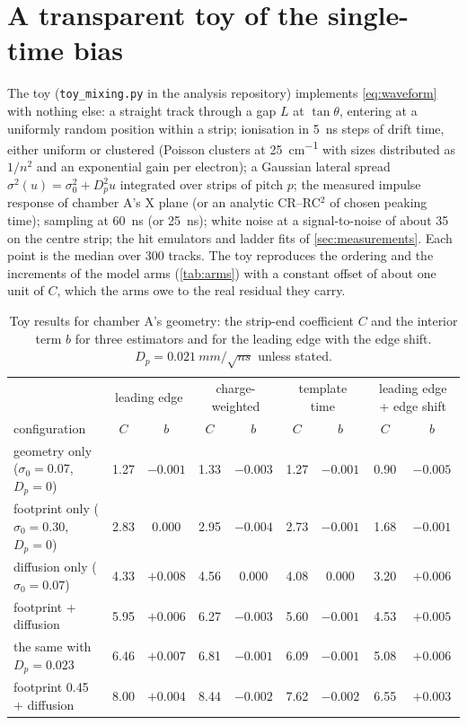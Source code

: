 \section{A transparent toy of the single-time bias}\label{app:toy}
\label{sec:toy}

The toy (\texttt{toy\_mixing.py} in the analysis repository) implements \cref{eq:waveform} with nothing else: a straight track
through a gap $L$ at $\tan\theta$, entering at a uniformly random position within a strip; ionisation in \SI{5}{ns} steps of
drift time, either uniform or clustered (Poisson clusters at \SI{25}{cm^{-1}} with sizes distributed as $1/n^2$ and an
exponential gain per electron); a Gaussian lateral spread $\sigma^2(u) = \sigma_0^2 + D_p^2 u$ integrated over strips of pitch $p$;
the measured impulse response of chamber A's X plane (or an analytic CR--RC$^2$ of chosen peaking time); sampling at
\SI{60}{ns} (or \SI{25}{ns}); white noise at a signal-to-noise of about 35 on the centre strip; the hit emulators and ladder
fits of \cref{sec:measurements}. Each point is the median over 300 tracks. The toy reproduces the ordering and the
increments of the model arms (\cref{tab:arms}) with a constant offset of about one unit of $C$, which the arms owe to the real
residual they carry.

\begin{table}[h]
  \centering\small
  \caption{Toy results for chamber A's geometry: the strip-end coefficient $C$ and the interior term $b$ for three
  estimators and for the leading edge with the edge shift. $D_p = \SI{0.021}{mm/\sqrt{ns}}$ unless stated.}
  \label{tab:toy}
  \begin{tabular}{@{}lcccccccc@{}}
    \toprule
    & \multicolumn{2}{c}{leading edge} & \multicolumn{2}{c}{charge-weighted} & \multicolumn{2}{c}{template time} & \multicolumn{2}{c}{leading edge + edge shift} \\
    configuration & $C$ & $b$ & $C$ & $b$ & $C$ & $b$ & $C$ & $b$ \\
    \midrule
    geometry only ($\sigma_0 = 0.07$, $D_p = 0$) & 1.27 & $-0.001$ & 1.33 & $-0.003$ & 1.27 & $-0.001$ & 0.90 & $-0.005$ \\
    footprint only ($\sigma_0 = 0.30$, $D_p = 0$) & 2.83 & $0.000$ & 2.95 & $-0.004$ & 2.73 & $-0.001$ & 1.68 & $-0.001$ \\
    diffusion only ($\sigma_0 = 0.07$) & 4.33 & $+0.008$ & 4.56 & $0.000$ & 4.08 & $0.000$ & 3.20 & $+0.006$ \\
    footprint + diffusion & 5.95 & $+0.006$ & 6.27 & $-0.003$ & 5.60 & $-0.001$ & 4.53 & $+0.005$ \\
    the same with $D_p = 0.023$ & 6.46 & $+0.007$ & 6.81 & $-0.001$ & 6.09 & $-0.001$ & 5.08 & $+0.006$ \\
    footprint 0.45 + diffusion & 8.00 & $+0.004$ & 8.44 & $-0.002$ & 7.62 & $-0.002$ & 6.55 & $+0.003$ \\
    \bottomrule
  \end{tabular}
\end{table}

